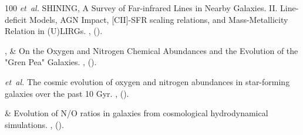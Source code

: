 \documentclass{nature2}
\begin{document}
\begin{thebibliography}{100}
 \emph{et~al.}
\newblock SHINING, A Survey of Far-infrared Lines in Nearby Galaxies. II. Line-deficit Models, AGN Impact, [CII]-SFR scaling relations, and Mass-Metallicity Relation in (U)LIRGs.
\newblock \emph{} \textbf{},
 ().

, 
 \&
\newblock On the Oxygen and Nitrogen Chemical Abundances and the Evolution of the "Gren Pea" Galaxies.
\newblock \emph{} \textbf{},
 ().

 \emph{et~al.}
\newblock The cosmic evolution of oxygen and nitrogen abundances in star-forming galaxies over the past 10 Gyr.
\newblock \emph{} \textbf{},
 ().

 \&
\newblock Evolution of N/O ratios in galaxies from cosmological hydrodynamical simulations.
\newblock \emph{} \textbf{},
 ().

\end{thebibliography}

\newpage
\end{document}
